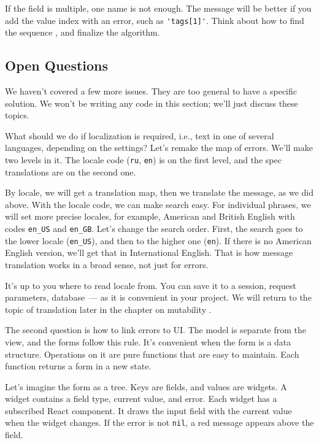 \fi

If the field is multiple, one name is not enough. The message will be better if you add the value index with an error, such as \verb|'tags[1]'|. Think about how to find the sequence , and finalize the algorithm.

\subsection{Open Questions}

We haven't covered a few more issues. They are too general to have a specific solution. We won't be writing any code in this section; we'll just discuss these topics.

What should we do if localization is required, i.e., text in one of several languages, depending on the settings? Let's remake the map of errors. We'll make two levels in it. The locale code (\verb|ru|, \verb|en|) is on the first level, and the spec translations are on the second one.


By locale, we will get a translation map, then we translate the message, as we did above. With the locale code, we can make search easy. For individual phrases, we will set more precise locales, for example, American and British English with codes \verb|en_US| and \verb|en_GB|. Let's change the search order. First, the search goes to the lower locale (\verb|en_US|), and then to the higher one (\verb|en|). If there is no American English version, we'll get that in International English. That is how message translation works in a broad sense, not just for errors.

It's up to you where to read locale from.  You can save it to a session, request parameters, database~--- as it is convenient in your project. We will return to the topic of translation later in the chapter on mutability .

The second question is how to link errors to UI. The model is separate from the view, and the forms follow this rule. It's convenient when the form is a data structure. Operations on it are pure functions that are easy to maintain. Each function returns a form in a new state.

Let's imagine the form as a tree. Keys are fields, and values are widgets. A widget contains a field type, current value, and error. Each widget has a subscribed React component. It draws the input field with the current value when the widget changes. If the error is not \verb|nil|, a red message appears above the field.

